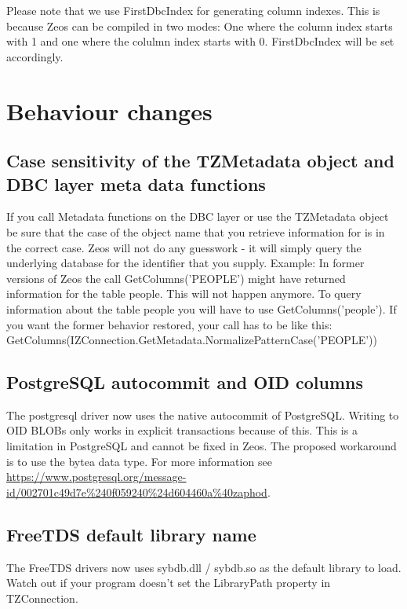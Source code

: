 \documentclass[a4paper,12pt,oneside]{book}
\begin{document}
Please note that we use FirstDbcIndex for generating column indexes.
This is because Zeos can be compiled in two modes: 
One where the column index starts with 1 and one where the colulmn index starts with 0. 
FirstDbcIndex will be set accordingly.

\section{Behaviour changes}
\label{sec:Rev4_BreakingChanges}
\subsection{Case sensitivity of the TZMetadata object and DBC layer meta data functions}
\label{sec:Rev4_BreakingChanges_MetadataCaseSensitivity}
If you call Metadata functions on the DBC layer or use the TZMetadata object be sure that the case of the object name that you retrieve information for is in the correct case.
Zeos will not do any guesswork - it will simply query the underlying database for the identifier that you supply.
Example: In former versions of Zeos the call GetColumns('PEOPLE') might have returned information for the table people.
This will not happen anymore.
To query information about the table people you will have to use GetColumns('people').
If you want the former behavior restored, your call has to be like this:\\
GetColumns(\-IZConnection.\-GetMetadata.\-NormalizePatternCase('PEOPLE'))

\subsection{PostgreSQL autocommit and OID columns}
\label{sec:Rev4_BreakingChanges_PostgresqlAutocommitOids}
The postgresql driver now uses the native autocommit of PostgreSQL.
Writing to OID BLOBs only works in explicit transactions because of this. 
This is a limitation in PostgreSQL and cannot be fixed in Zeos.
The proposed workaround is to use the bytea data type.
For more information see \url{https://www.postgresql.org/message-id/002701c49d7e%240f059240%24d604460a%40zaphod}.

\subsection{FreeTDS default library name}
\label{sec:Rev4_BreakingChanges_FreetdsDefaultLIbraryName}
The FreeTDS drivers now uses sybdb.dll / sybdb.so as the default library to load.
Watch out if your program doesn't set the LibraryPath property in TZConnection.
\end{document}
